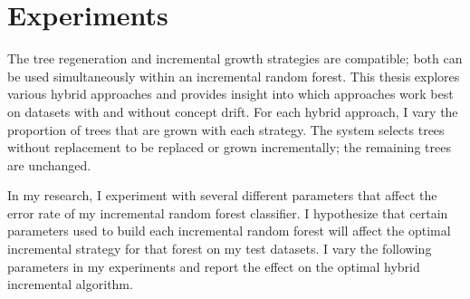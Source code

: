 

\section{Experiments}

The tree regeneration and incremental growth strategies are compatible; both
can be used simultaneously within an incremental random forest. This thesis
explores various hybrid approaches and provides insight into which approaches
work best on datasets with and without concept drift. For each hybrid approach,
I vary the proportion of trees that are grown with each strategy. The system
selects trees without replacement to be replaced or grown incrementally; the
remaining trees are unchanged. 

In my research, I experiment with several different parameters that affect the
error rate of my incremental random forest classifier. I hypothesize that
certain parameters used to build each incremental random forest will affect the
optimal incremental strategy for that forest on my test datasets. I vary the
following parameters in my experiments and report the effect on the optimal
hybrid incremental algorithm.

